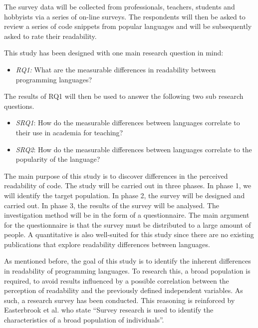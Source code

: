 \documentclass[times, 10pt,twocolumn]{IEEEtran}
\begin{document}
The survey data will be collected from professionals, teachers, students and hobbyists via a series of on-line surveys. The respondents will then be asked to review a series of code snippets from popular languages and will be subsequently asked to rate their readability. 
\newline

This study has been designed with one main research question in mind:
\begin{itemize}
\item \textit{RQ1:} What are the measurable differences in readability between programming languages?
\end{itemize}


The results of RQ1 will then be used to answer the following two sub research questions. 
\begin{itemize}
\item \textit{SRQ1}: How do the measurable differences between languages correlate to their use in academia for teaching?
\item \textit{SRQ2}: How do the measurable differences between languages correlate to the popularity of the language?
\end{itemize}


The main purpose of this study is to discover differences in the perceived readability of code. The study will be carried out in three phases. In phase 1, we will identify the target population. In phase 2, the survey will be designed and carried out. In phase 3, the results of the survey will be analysed. The investigation method will be in the form of a questionnaire. The main argument for the questionnaire is that the survey must be distributed to a large amount of people. A quantitative is also well-suited for this study since there are no existing publications that explore readability differences between languages. 

As mentioned before, the goal of this study is to identify the inherent differences in readability of programming languages. To research this, a broad population is required, to avoid results influenced by a possible correlation between the perception of readability and the previously defined independent variables. As such, a research survey has been conducted. This reasoning is reinforced by Easterbrook et al. \cite{easterbrook2008selecting} who state ``Survey research is used to identify the characteristics of a broad population of individuals''. 
\newline
\end{document}

